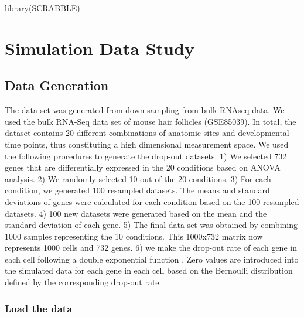 \documentclass[]{article}
\author{Tao Peng}
\date{Updated on 2018-06-15}
\newcommand{\hlstd}[1]{\textcolor[rgb]{0.251,0.251,0.251}{#1}}%
\newcommand{\hlkwd}[1]{\textcolor[rgb]{0.878,0.439,0.125}{#1}}%
\newenvironment{Shaded}{\begin{myshaded}}{\end{myshaded}}
\newcommand{\KeywordTok}[1]{\hlkwd{#1}}
\newcommand{\NormalTok}[1]{\hlstd{#1}}
\begin{document}
\maketitle


{
\setcounter{tocdepth}{2}
\tableofcontents
\newpage
}
\begin{Shaded}
\begin{Highlighting}[]
 \KeywordTok{library}\NormalTok{(SCRABBLE)}
\end{Highlighting}
\end{Shaded}

\section{Simulation Data Study}\label{simulation-data-study}

\subsection{Data Generation}\label{data-generation}

The data set was generated from down sampling from bulk RNAseq data. We
used the bulk RNA-Seq data set of mouse hair follicles (GSE85039). In
total, the dataset contains 20 different combinations of anatomic sites
and developmental time points, thus constituting a high dimensional
measurement space. We used the following procedures to generate the
drop-out datasets. 1) We selected 732 genes that are differentially
expressed in the 20 conditions based on ANOVA analysis. 2) We randomly
selected 10 out of the 20 conditions. 3) For each condition, we
generated 100 resampled datasets. The means and standard deviations of
genes were calculated for each condition based on the 100 resampled
datasets. 4) 100 new datasets were generated based on the mean and the
standard deviation of each gene. 5) The final data set was obtained by
combining 1000 samples representing the 10 conditions. This 1000x732
matrix now represents 1000 cells and 732 genes. 6) we make the drop-out
rate of each gene in each cell following a double exponential function .
Zero values are introduced into the simulated data for each gene in each
cell based on the Bernoulli distribution defined by the corresponding
drop-out rate.

\subsubsection{Load the data}\label{load-the-data}
\end{document}
